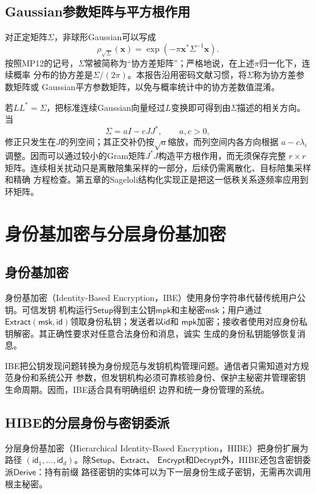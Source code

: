 \subsection{Gaussian参数矩阵与平方根作用}

对正定矩阵$\Sigma$，非球形Gaussian可以写成
\[
 \rho_{\sqrt\Sigma}(\mathbf x)
 =\exp(-\pi\mathbf x^*\Sigma^{-1}\mathbf x).
\]
按照MP12的记号，$\Sigma$常被简称为“协方差矩阵”；严格地说，在上述$\pi$归一化下，连续概率
分布的协方差是$\Sigma/(2\pi)$。本报告沿用密码文献习惯，将$\Sigma$称为协方差参数矩阵或
Gaussian平方参数矩阵，以免与概率统计中的协方差数值混淆。

若$L L^*=\Sigma$，把标准连续Gaussian向量经过$L$变换即可得到由$\Sigma$描述的相关方向。
当
\[
 \Sigma=aI-cJJ^*,\qquad a,c>0,
\]
修正只发生在$J$的列空间；其正交补仍按$\sqrt a$缩放，而列空间内各方向根据
$a-c\lambda_i$调整。因而可以通过较小的Gram矩阵$J^*J$构造平方根作用，而无须保存完整
$r\times r$矩阵。连续相关扰动只是离散陪集采样的一部分，后续仍需离散化、目标陪集采样和精确
方程检查。第五章的Sageloli结构化实现正是把这一低秩关系逐频率应用到环矩阵。

\section{身份基加密与分层身份基加密}

\subsection{身份基加密}

身份基加密（Identity-Based Encryption，IBE）使用身份字符串代替传统用户公钥。可信发钥
机构运行$\mathsf{Setup}$得到主公钥$\mathsf{mpk}$和主秘密$\mathsf{msk}$；用户通过
$\mathsf{Extract}(\mathsf{msk},\mathsf{id})$领取身份私钥；发送者以$\mathsf{id}$和
$\mathsf{mpk}$加密；接收者使用对应身份私钥解密。其正确性要求对任意合法身份和消息，诚实
生成的身份私钥能够恢复消息。

IBE把公钥发现问题转换为身份规范与发钥机构管理问题。通信者只需知道对方规范身份和系统公开
参数，但发钥机构必须可靠核验身份、保护主秘密并管理密钥生命周期。因而，IBE适合具有明确组织
边界和统一身份管理的系统。

\subsection{HIBE的分层身份与密钥委派}

分层身份基加密（Hierarchical Identity-Based Encryption，HIBE）把身份扩展为路径
$(\mathsf{id}_1,\ldots,\mathsf{id}_d)$。除$\mathsf{Setup}$、$\mathsf{Extract}$、
$\mathsf{Encrypt}$和$\mathsf{Decrypt}$外，HIBE还包含密钥委派$\mathsf{Derive}$：持有前缀
路径密钥的实体可以为下一层身份生成子密钥，无需再次调用根主秘密。


